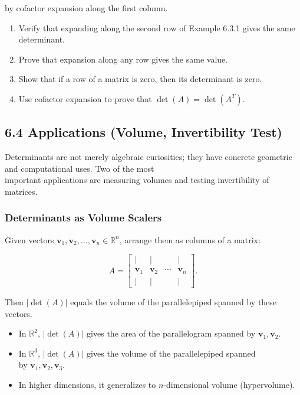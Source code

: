 \documentclass[
  12pt,
  a4paper,
]{article}
\begin{document}
by cofactor expansion along the first column.

\begin{enumerate}
\def\labelenumi{\arabic{enumi}.}
\item
  Verify that expanding along the second row of Example 6.3.1 gives the
  same determinant.
\item
  Prove that expansion along any row gives the same value.
\item
  Show that if a row of a matrix is zero, then its determinant is zero.
\item
  Use cofactor expansion to prove that \(\det(A) = \det(A^T)\).
\end{enumerate}

\subsection{6.4 Applications (Volume, Invertibility
Test)}\label{64-applications-volume-invertibility-test}

Determinants are not merely algebraic curiosities; they have concrete
geometric and computational uses. Two of the most\\
important applications are measuring volumes and testing invertibility
of matrices.

\subsubsection{Determinants as Volume
Scalers}\label{determinants-as-volume-scalers}

Given vectors
\(\mathbf{v}_1, \mathbf{v}_2, \dots, \mathbf{v}_n \in \mathbb{R}^n\),
arrange them as columns of a matrix:

\[A = \begin{bmatrix}
| & | & & | \\
\mathbf{v}_1 & \mathbf{v}_2 & \cdots & \mathbf{v}_n \\
| & | & & |
\end{bmatrix}.\]

Then \(|\det(A)|\) equals the volume of the parallelepiped spanned by
these vectors.

\begin{itemize}
\item
  In \(\mathbb{R}^2\), \(|\det(A)|\) gives the area of the parallelogram
  spanned by \(\mathbf{v}_1, \mathbf{v}_2\).
\item
  In \(\mathbb{R}^3\), \(|\det(A)|\) gives the volume of the
  parallelepiped spanned\\
  by \(\mathbf{v}_1, \mathbf{v}_2, \mathbf{v}_3\).
\item
  In higher dimensions, it generalizes to \(n\)-dimensional volume
  (hypervolume).
\end{itemize}
\end{document}
